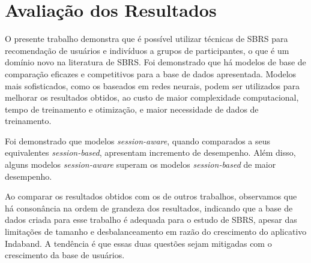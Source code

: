 \section{Avaliação dos Resultados}
O presente trabalho demonstra que é possível utilizar técnicas de SBRS para
recomendação de usuários e indivíduos a grupos de participantes, o que é um
domínio novo na literatura de SBRS. Foi demonstrado que há modelos de base de
comparação eficazes e competitivos para a base de dados apresentada. Modelos
mais sofisticados, como os baseados em redes neurais, podem ser utilizados para
melhorar os resultados obtidos, ao custo de maior complexidade computacional,
tempo de treinamento e otimização, e maior necessidade de dados de treinamento.

Foi demonstrado que modelos \textit{session-aware}, quando comparados a
seus equivalentes \textit{session-based}, apresentam incremento de desempenho.
Além disso, alguns modelos \textit{session-aware} superam os modelos
\textit{session-based} de maior desempenho.

Ao comparar os resultados obtidos com os de outros trabalhos, observamos que há
consonância na ordem de grandeza dos resultados, indicando que a base de dados
criada para esse trabalho é adequada para o estudo de SBRS, apesar das
limitações de tamanho e desbalanceamento em razão do crescimento do aplicativo
Indaband. A tendência é que essas duas questões sejam mitigadas com o crescimento da base
de usuários.
